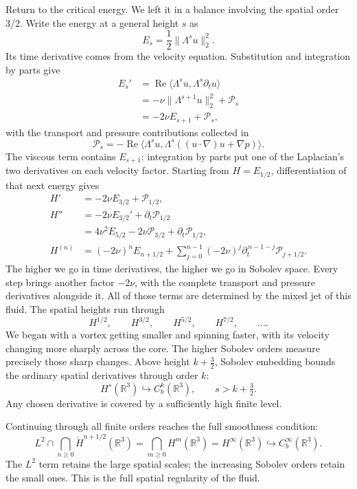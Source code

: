 Return to the critical energy. We left it in a balance involving the
spatial order \(3/2\). Write the energy at a general height \(s\) as
\[
 E_s=\frac12\|\Lambda^su\|_2^2.
\]
Its time derivative comes from the velocity equation. Substitution and
integration by parts give
\[
 \begin{aligned}
 E_s'
 &=\operatorname{Re}\langle\Lambda^su,\Lambda^s\partial_tu\rangle\\
 &=-\nu\|\Lambda^{s+1}u\|_2^2+\mathcal P_s\\
 &=-2\nu E_{s+1}+\mathcal P_s,
 \end{aligned}
\]
with the transport and pressure contributions collected in
\[
 \mathcal P_s=-\operatorname{Re}\langle\Lambda^su,
 \Lambda^s((u\cdot\nabla)u+\nabla p)\rangle.
\]
The viscous term contains \(E_{s+1}\): integration by parts put one
of the Laplacian's two derivatives on each velocity factor. Starting
from \(H=E_{1/2}\), differentiation of that next energy gives
\[
 \begin{aligned}
 H'&=-2\nu E_{3/2}+\mathcal P_{1/2},\\
 H''&=-2\nu E_{3/2}'+\partial_t\mathcal P_{1/2}\\
    &=4\nu^2E_{5/2}-2\nu\mathcal P_{3/2}
        +\partial_t\mathcal P_{1/2},\\
 H^{(n)}&=(-2\nu)^nE_{n+1/2}
        +\sum_{j=0}^{n-1}(-2\nu)^j
           \partial_t^{\,n-1-j}\mathcal P_{j+1/2}.
 \end{aligned}
\]
The higher we go in time derivatives, the higher we go in Sobolev space.
Every step brings another factor \(-2\nu\), with the complete transport
and pressure derivatives alongside it. All of those terms are determined
by the mixed jet of this fluid. The spatial heights run through
\[
 H^{1/2},\qquad H^{3/2},\qquad H^{5/2},\qquad H^{7/2},\qquad\ldots.
\]
We began with a vortex getting smaller and spinning faster, with its
velocity changing more sharply across the core. The higher Sobolev
orders measure precisely those sharp changes. Above height
\(k+\tfrac32\), Sobolev embedding bounds the ordinary spatial
derivatives through order \(k\):
\[
 H^s(\mathbb R^3)\hookrightarrow C_b^k(\mathbb R^3),
 \qquad s>k+\tfrac32.
\]
Any chosen derivative is covered by a sufficiently high finite level.

\label{u:guide:intersection}
Continuing through all finite orders reaches the full smoothness condition:
\[
 L^2\cap\bigcap_{n\ge0}\dot H^{n+1/2}(\mathbb R^3)
 =\bigcap_{m\ge0}H^m(\mathbb R^3)
 =H^\infty(\mathbb R^3)\hookrightarrow C_b^\infty(\mathbb R^3).
\]
The \(L^2\) term retains the large spatial scales; the increasing Sobolev
orders retain the small ones. This is the full spatial regularity of the
fluid.

